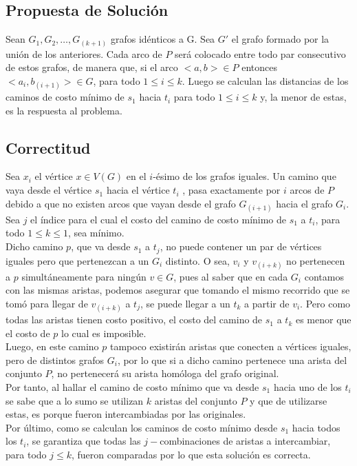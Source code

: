 \documentclass[a4paper,10pt]{article}
\begin{document}
	\subsection{Propuesta de Soluci\'on}
	Sean $G_1,G_2,…,G_{(k+1)}$ grafos idénticos a G. Sea $G'$ el grafo formado por la unión de los anteriores. Cada arco de $P$ será colocado entre todo par consecutivo de estos grafos, de manera que, si el arco $<a,b> \in P$ entonces $<a_i,b_{(i+1)}> \in G$, para todo $1 \leq i \leq k$. Luego se calculan las distancias de los caminos de costo mínimo de $s_1$ hacia $t_i$  para todo $1 \leq i \leq k$ y, la menor de estas, es la respuesta al problema.
	\subsection{Correctitud}
	Sea $x_i$ el vértice $x \in V(G)$ en el $i$-ésimo de los grafos iguales. Un camino que vaya desde el vértice $s_1$ hacia el vértice $t_i$ , pasa exactamente por $i$ arcos de $P$ debido a que no existen arcos que vayan desde el grafo $G_{(i+1)}$ hacia el grafo $G_i$. 
	\\Sea $j$ el índice para el cual el costo del camino de costo mínimo de $s_1$ a $t_i$, para todo $1\leq k \leq 1$, sea mínimo. 
	\\Dicho camino $p$, que va desde $s_1$  a $t_j$, no puede contener un par de vértices iguales pero que pertenezcan a un $G_i$ distinto. O sea, $v_i$ y $v_{(i+k)}$ no pertenecen a $p$ simultáneamente para ningún $v \in G$, pues al saber que en cada $G_i$ contamos con las mismas aristas, podemos asegurar que tomando el mismo recorrido que se tomó para llegar de $v_{(i+k)}$ a $t_j$, se puede llegar a un $t_k$ a partir de $v_i$. Pero como todas las aristas tienen costo positivo, el costo del camino de $s_1$ a $t_k$ es menor que el costo de $p$ lo cual es imposible.
	\\Luego, en este camino $p$ tampoco existirán aristas que conecten a vértices iguales, pero de distintos grafos $G_i$, por lo que si a dicho camino pertenece una arista del conjunto $P$, no pertenecerá su arista homóloga del grafo original.
	\\Por tanto, al hallar el camino de costo mínimo que va desde $s_1$ hacia uno de los $t_i$ se sabe que a lo sumo se utilizan $k$ aristas del conjunto $P$ y que de utilizarse estas, es porque fueron intercambiadas por las originales.
	\\Por último, como se calculan los caminos de costo mínimo desde $s_1$ hacia todos los $t_i$, se garantiza que todas las $j-$combinaciones de aristas a intercambiar, para todo $j \leq k$, fueron comparadas por lo que esta solución es correcta.
\end{document}
